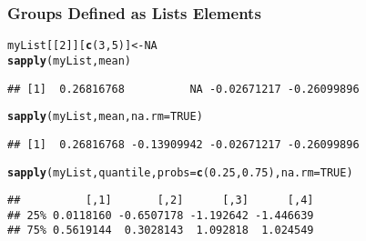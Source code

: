 \documentclass[paper=screen,mathserif]{beamer}\usepackage[]{graphicx}\usepackage[]{color}
\makeatletter
\newcommand{\hlnum}[1]{\textcolor[rgb]{0.686,0.059,0.569}{#1}}%
\newcommand{\hlstd}[1]{\textcolor[rgb]{0.345,0.345,0.345}{#1}}%
\newcommand{\hlkwb}[1]{\textcolor[rgb]{0.69,0.353,0.396}{#1}}%
\newcommand{\hlkwc}[1]{\textcolor[rgb]{0.333,0.667,0.333}{#1}}%
\newcommand{\hlkwd}[1]{\textcolor[rgb]{0.737,0.353,0.396}{\textbf{#1}}}%
\newenvironment{kframe}{%
 \def\at@end@of@kframe{}%
 \ifinner\ifhmode%
  \def\at@end@of@kframe{\end{minipage}}%
  \begin{minipage}{\columnwidth}%
 \fi\fi%
 \def\FrameCommand##1{\hskip\@totalleftmargin \hskip-\fboxsep
 \colorbox{shadecolor}{##1}\hskip-\fboxsep
     \hskip-\linewidth \hskip-\@totalleftmargin \hskip\columnwidth}%
 \MakeFramed {\advance\hsize-\width
   \@totalleftmargin\z@ \linewidth\hsize
   \@setminipage}}%
 {\par\unskip\endMakeFramed%
 \at@end@of@kframe}
\newenvironment{knitrout}{}{} %
\newcommand{\ft}[1]{\frametitle{#1}}
\makeatother
\begin{document}
\begin{frame}[fragile]
  \ft{Groups Defined as Lists Elements}
  
\begin{knitrout}\scriptsize
{}\color{fgcolor}\begin{kframe}
\begin{alltt}
\hlstd{myList[[}\hlnum{2}\hlstd{]][}\hlkwd{c}\hlstd{(}\hlnum{3}\hlstd{,} \hlnum{5}\hlstd{)]} \hlkwb{<-} \hlnum{NA}
\hlkwd{sapply}\hlstd{(myList, mean)}
\end{alltt}
\begin{verbatim}
## [1]  0.26816768          NA -0.02671217 -0.26099896
\end{verbatim}
\end{kframe}
\end{knitrout}

\begin{knitrout}\scriptsize
{}\color{fgcolor}\begin{kframe}
\begin{alltt}
\hlkwd{sapply}\hlstd{(myList, mean,} \hlkwc{na.rm} \hlstd{=} \hlnum{TRUE}\hlstd{)}
\end{alltt}
\begin{verbatim}
## [1]  0.26816768 -0.13909942 -0.02671217 -0.26099896
\end{verbatim}
\end{kframe}
\end{knitrout}

\begin{knitrout}\scriptsize
{}\color{fgcolor}\begin{kframe}
\begin{alltt}
\hlkwd{sapply}\hlstd{(myList, quantile,} \hlkwc{probs} \hlstd{=} \hlkwd{c}\hlstd{(}\hlnum{0.25}\hlstd{,} \hlnum{0.75}\hlstd{),} \hlkwc{na.rm} \hlstd{=} \hlnum{TRUE}\hlstd{)}
\end{alltt}
\begin{verbatim}
##          [,1]       [,2]      [,3]      [,4]
## 25% 0.0118160 -0.6507178 -1.192642 -1.446639
## 75% 0.5619144  0.3028143  1.092818  1.024549
\end{verbatim}
\end{kframe}
\end{knitrout}

\end{frame}
\end{document}
